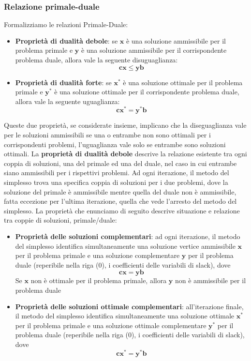\documentclass[12pt]{article}
\begin{document}
\subsubsection{Relazione primale-duale}
Formalizziamo le relazioni Primale-Duale:
\begin{itemize}
    \item \textbf{Proprietà di dualità debole}: se $\boldsymbol{x}$ è una soluzione ammissibile per il problema primale e $\boldsymbol{y}$ è una soluzione ammissibile per il corrispondente problema duale, allora vale la seguente disuguaglianza:
    $$\boldsymbol{c}\boldsymbol{x} \leq \boldsymbol{y}\boldsymbol{b}$$
    \item \textbf{Proprietà di dualità forte}: se $\boldsymbol{x}^*$ è una soluzione ottimale per il problema primale e $\boldsymbol{y}^*$ è una soluzione ottimale per il corrispondente problema duale, allora vale la seguente uguaglianza:
    $$\boldsymbol{c}\boldsymbol{x}^* = \boldsymbol{y}^*\boldsymbol{b}$$
\end{itemize}
Queste due proprietà, se considerate insieme, implicano che la diseguaglianza vale per le soluzioni ammissibili se una o entrambe non sono ottimali per i corrispondenti problemi,
l'uguaglianza vale solo se entrambe sono soluzioni ottimali.
La \textbf{proprietà di dualità debole} descrive la relazione esistente tra ogni coppia di soluzioni, una del primale ed una del duale, nel caso in cui entrambe siano ammissibili per i rispettivi problemi.
Ad ogni iterazione, il metodo del simplesso trova una specifica coppia di soluzioni per i due problemi, dove la soluzione del primale è ammissibile mentre quella del duale non è ammissibile, fatta eccezione per l'ultima iterazione, quella che vede l'arresto del metodo del simplesso.
La proprietà che enunciamo di seguito descrive situazione e relazione tra coppie di soluzioni, primale/duale:
\begin{itemize}
    \item \textbf{Proprietà delle soluzioni complementari}: ad ogni iterazione, il metodo del simplesso identifica simultaneamente una soluzione vertice ammissibile $\boldsymbol{x}$ per il problema primale
    e una soluzione complementare $\boldsymbol{y}$ per il problema duale (reperibile nella riga (0), i coefficienti delle variabili di slack), dove
    $$\boldsymbol{c}\boldsymbol{x} = \boldsymbol{y}\boldsymbol{b}$$
    Se $\boldsymbol{x}$ non è ottimale per il problema primale, allora $\boldsymbol{y}$ non è ammissibile per il problema duale
    \item \textbf{Proprietà delle soluzioni ottimale complementari}: all'iterazione finale, il metodo del simplesso identifica simultaneamente una soluzione ottimale $\boldsymbol{x}^*$ per il problema primale e una soluzione
    ottimale complementare $\boldsymbol{y}^*$ per il problema duale (reperibile nella riga (0), i coefficienti delle variabili di slack), dove
    $$\boldsymbol{c}\boldsymbol{x}^* = \boldsymbol{y}^*\boldsymbol{b}$$
\end{itemize}
\end{document}
